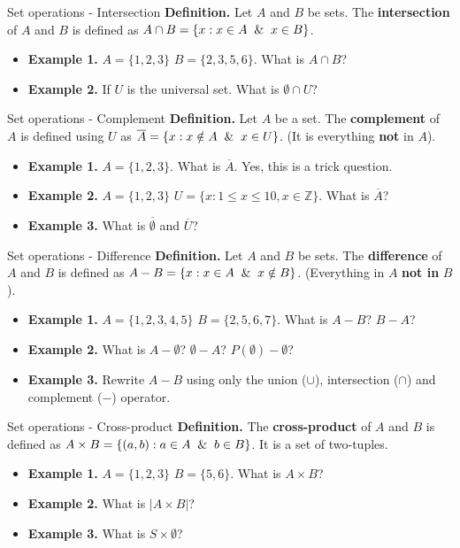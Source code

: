 \documentclass[10pt]{beamer}
\begin{document}
\begin{frame}{Set operations - Intersection}
    \textbf{Definition.} Let $A$ and $B$ be sets. The \textbf{intersection} of $A$ and $B$ is defined as $A \cap B = \{x: x \in A \And x \in B\}$.
    \begin{itemize}
        \item \textbf{Example 1.} $A=\{1,2,3\}$ $B=\{2,3,5,6\}$. What is $A \cap B$?
        \item \textbf{Example 2.} If $U$ is the universal set. What is $\emptyset \cap U$?
    \end{itemize}
\end{frame}

\begin{frame}{Set operations - Complement}
    \textbf{Definition.} Let $A$ be a set. The \textbf{complement} of $A$ is defined using $U$ as $\overline{A} = \{x: x \notin A \And x \in U\}$. (It is everything \textbf{not} in $A$).
    \begin{itemize}
        \item \textbf{Example 1.} $A = \{1,2,3\}$. What is $\overline{A}$. Yes, this is a trick question.
        \item \textbf{Example 2.} $A = \{1,2,3\}$ $U = \{x: 1 \leq x \leq 10, x \in \mathbb{Z}\}$. What is $\overline{A}$?
        \item \textbf{Example 3.} What is $\overline{\emptyset}$ and $\overline{U}$?
    \end{itemize}
\end{frame}

\begin{frame}{Set operations - Difference}
    \textbf{Definition.} Let $A$ and $B$ be sets. The \textbf{difference} of $A$ and $B$ is defined as $A - B = \{x: x \in A \And x \notin B\}$. (Everything in $A$ \textbf{not in} $B$).
    \begin{itemize}
        \item \textbf{Example 1.} $A = \{1,2,3,4,5\}$ $B=\{2,5,6,7\}$. What is $A - B$? $B - A$?
        \item \textbf{Example 2.} What is $A - \emptyset$? $\emptyset - A$? $P(\emptyset) - \emptyset$?
        \item \textbf{Example 3.} Rewrite $A - B$ using only the union ($\cup$), intersection ($\cap$) and complement ($-$) operator.
    \end{itemize}
\end{frame}

\begin{frame}{Set operations - Cross-product}
    \textbf{Definition.} The \textbf{cross-product} of $A$ and $B$ is defined as $A \times B = \{(a,b): a \in A \And b \in B\}$. It is a set of two-tuples.
    \begin{itemize}
        \item \textbf{Example 1.} $A = \{1,2,3\}$ $B = \{5,6\}$. What is $A \times B$?
        \item \textbf{Example 2.} What is $|A \times B|$?
        \item \textbf{Example 3.} What is $S \times \emptyset$?
    \end{itemize}
\end{frame}
\end{document}
